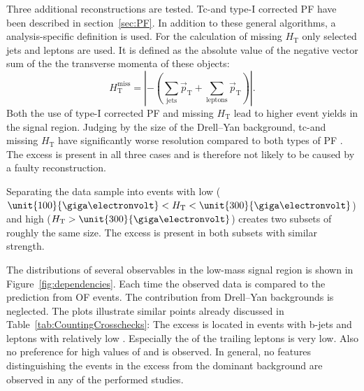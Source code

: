 Three additional \MET reconstructions are tested. Tc-\MET and type-I corrected PF \MET have been described in section~\ref{sec:PF}. In addition to these general algorithms, a analysis-specific definition is used. For the calculation of missing $H_{\mathrm{T}}$ only selected jets and leptons are used. It is defined as the absolute value of the negative vector sum of the the transverse momenta of these objects: 
\begin{equation*}
H_{\mathrm{T}}^{\mathrm{miss}} = | -(\sum\limits_{\mathrm{jets}}\vec{p}_{\mathrm{T}} + \sum\limits_{\mathrm{leptons}}\vec{p}_{\mathrm{T}}) |.
\end{equation*}  
Both the use of type-I corrected PF \MET and missing $H_{\mathrm{T}}$ lead to higher event yields in the signal region. Judging by the size of the Drell--Yan background, tc-\MET and missing $H_{\mathrm{T}}$ have significantly worse \MET resolution compared to both types of PF \MET. The excess is present in all three cases and is therefore not likely to be caused by a faulty \MET reconstruction. 

Separating the data sample into events with low \HT ($\unit{100}{\giga\electronvolt} < \HT <\unit{300}{\giga\electronvolt}$) and high \HT ($\HT > \unit{300}{\giga\electronvolt}$) creates two subsets of roughly the same size. The excess is present in both subsets with similar strength. 
 



The distributions of several observables in the low-mass signal region is shown in Figure~\ref{fig:dependencies}. Each time the observed data is compared to the prediction from OF events. The contribution from Drell--Yan backgrounds is neglected. The plots illustrate similar points already discussed in Table~\ref{tab:CountingCrosschecks}: The excess is located in events with b-jets and leptons with relatively low \pt. Especially the \pt of the trailing leptons is very low. Also no preference for high values of \HT and \MET is observed. In general, no features distinguishing the events in the excess from the dominant \ttbar background are observed in any of the performed studies. 


